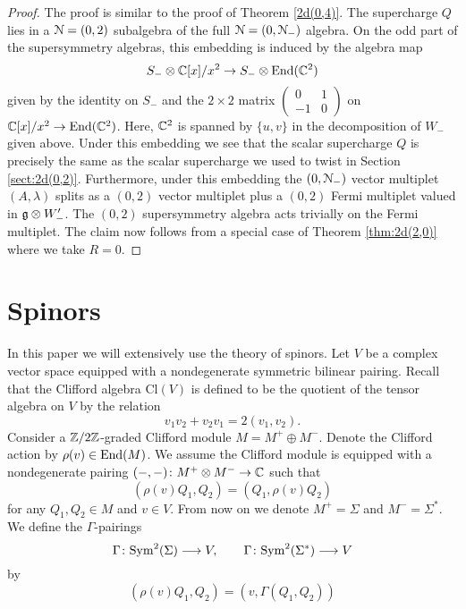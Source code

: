 \documentclass[10pt, oneside]{article}
\newcommand{\Cl}{\mathrm{Cl}}
\begin{document}
\begin{proof}
The proof is similar to the proof of Theorem \ref{2d(0,4)}.
The supercharge $Q$ lies in a $\mathcal N = (0,2)$ subalgebra of the full $\mathcal N = (0,\mathcal N_-)$ algebra.
On the odd part of the supersymmetry algebras, this embedding is induced by the algebra map
\[
S_- \otimes \mathbb C[x] / x^2 \to S_- \otimes {\rm End}(\mathbb C^2)
\]
given by the identity on $S_-$ and the $2 \times 2$ matrix $\begin{pmatrix} 0 &1 \\ -1 & 0 \end{pmatrix}$ on $\mathbb C[x]/x^2 \to {\rm End}(\mathbb C^2)$. 
Here, $\mathbb C^2$ is spanned by $\{u,v\}$ in the decomposition of $W_-$ given above.
Under this embedding we see that the scalar supercharge $Q$ is precisely the same as the scalar supercharge we used to twist in Section \ref{sect:2d(0,2)}. 
Furthermore, under this embedding the $(0,\mathcal N_-)$ vector multiplet $(A, \lambda)$ splits as a $(0,2)$ vector multiplet plus a $(0,2)$ Fermi multiplet valued in $\mathfrak g \otimes W_-'$. 
The $(0,2)$ supersymmetry algebra acts trivially on the Fermi multiplet. 
The claim now follows from a special case of Theorem \ref{thm:2d(2,0)} where we take $R = 0$. 
\end{proof}

\appendix

\section{Spinors}
\label{sect:spinors}

In this paper we will extensively use the theory of spinors. Let $V$ be a complex vector space equipped with a nondegenerate symmetric bilinear pairing. Recall that the Clifford algebra $\Cl(V)$ is defined to be the quotient of the tensor algebra on $V$ by the relation
\[v_1 v_2 + v_2 v_1 = 2(v_1, v_2).\]
Consider a $\mathbb Z/2\mathbb Z$-graded Clifford module $M=M^+\oplus M^-$. Denote the Clifford action by $\rho(v)\in\operatorname{End}(M)$. We assume the Clifford module is equipped with a nondegenerate pairing $(-, -)\colon M^+\otimes M^-\rightarrow \mathbb C$ such that
\[(\rho(v) Q_1, Q_2) = (Q_1, \rho(v) Q_2)\]
for any $Q_1, Q_2\in M$ and $v\in V$. From now on we denote $M^+=\Sigma$ and $M^-=\Sigma^*$. We define the $\Gamma$-pairings
\[\Gamma\colon{\rm Sym}^2(\Sigma)\longrightarrow V,\qquad \Gamma\colon{\rm Sym}^2(\Sigma^*)\longrightarrow V\]
by
\begin{equation}
(\rho(v) Q_1, Q_2) = (v, \Gamma(Q_1, Q_2))
\label{eq:Gammaspinorpairing}
\end{equation}
\end{document}
